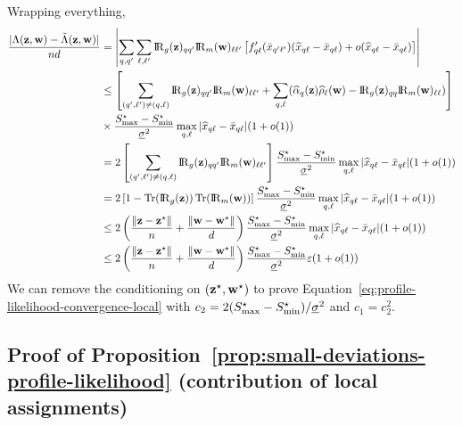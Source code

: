 Wrapping everything,
\begin{align*}
\frac{| \Lamb(\bz, \bw) - \Lambtilde(\bz, \bw) | }{\n\dd} & = \left| \sum_{\kk,\kp} \sum_{\el,\lp} \Rgbz_{\kk\kp}\Rmbw_{\el\lp} \left[ f'_{\kk\el}(\barx_{\kp\lp}) (\hxkl -\barxkl) + \smallO(\hxkl -\barxkl) \right]\right| \\
& \leq \left[ \sum_{(\kp,\lp) \neq (\kk, \el)} \Rgbz_{\kk\kp}\Rmbw_{\el\lp} + \sum_{\kk, \el} ( \pizk \rhowl - \Rgbz_{\kk\kk}\Rmbw_{\el\el} ) \right]\\ & \times \frac{\Salmax - \Salmin}{\vmin^2} \max_{\kk, \el} | \hxkl -\barxkl | (1 +\smallO(1)) \\
& = 2 \left[ \sum_{(\kp,\lp) \neq (\kk, \el)} \Rgbz_{\kk\kp}\Rmbw_{\el\lp} \right] \frac{\Salmax - \Salmin}{\vmin^2} \max_{\kk, \el} | \hxkl -\barxkl | (1 +\smallO(1)) \\
& = 2 \left[ 1 - \Trace(\Rgbz)\Trace(\Rmbw) \right] \frac{\Salmax - \Salmin}{\vmin^2} \max_{\kk, \el} | \hxkl -\barxkl | (1 +\smallO(1)) \\
& \leq 2\left( \frac{\|\bz -\bzs\|}{\n} + \frac{\|\bw -\bws\|}{\dd} \right) \frac{\Salmax - \Salmin}{\vmin^2} \max_{\kk, \el} | \hxkl -\barxkl | (1 +\smallO(1)) \\
& \leq 2\left( \frac{\|\bz -\bzs\|}{\n} + \frac{\|\bw -\bws\|}{\dd} \right) \frac{\Salmax - \Salmin}{\vmin^2} \vareps (1 +\smallO(1))
\end{align*}
We can remove the conditioning on $(\mathbf{z}^\star, \mathbf{w}^\star)$ to prove Equation~\eqref{eq:profile-likelihood-convergence-local} with $c_2 = 2(S^\star_{\max} - S^\star_{\min}) / \underline{\sigma}^2$ and $c_1 = c_2^2$.
\proofend

\subsection{Proof of Proposition~\ref{prop:small-deviations-profile-likelihood} (contribution of local assignments)} 

